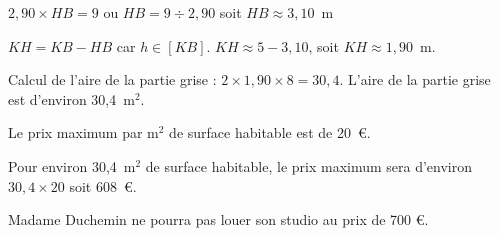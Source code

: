 $2,90 \times HB= 9$ ou  $HB= 9\div2,90$ soit  $HB\approx3,10$~m

$KH = KB - HB$ car $h \in [KB]$.
 $KH\approx5-3,10$, soit $KH\approx1,90$~m.

Calcul de l'aire de la partie grise : \quad $2\times 1,90 \times 8=30,4$. \quad L'aire de la partie grise est d'environ 30,4~m$^2$.

Le prix maximum par m$^2$ de surface habitable est de 20~\euro{}.

Pour environ 30,4~m$^2$ de surface habitable, le prix maximum sera d'environ $30,4\times 20$ soit 608~\euro{}.

Madame Duchemin ne pourra pas louer son studio au prix de  700 \euro. 

\vspace{0.5cm}

